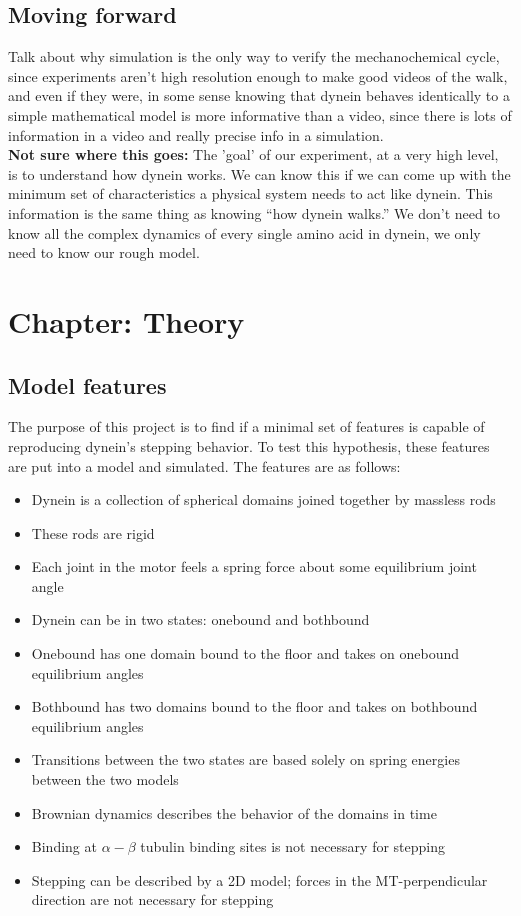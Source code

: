 \documentclass[10pt]{article} %
\begin{document}
\subsection{Moving forward}
Talk about why simulation is the only way to verify the mechanochemical cycle, since experiments
aren't high resolution enough to make good videos of the walk, and even if they were, in some sense
knowing that dynein behaves identically to a simple mathematical model is more informative than
a video, since there is lots of information in a video and really precise info in a simulation.\\

\textbf{Not sure where this goes:} The 'goal' of our experiment, at a very high level, is to
understand how dynein works. We can know this if we can come up with the minimum set of characteristics a physical system needs to act like dynein. This information is the same thing as knowing
``how dynein walks.'' We don't need to know all the complex dynamics of every single amino acid in
dynein, we only need to know our rough model.\\

\section{Chapter: Theory}
\subsection{Model features}
The purpose of this project is to find if a minimal set of features is capable of reproducing dynein's stepping behavior. To test this hypothesis, these features are put into a model and simulated. The features are as follows:

\begin{itemize}
\item Dynein is a collection of spherical domains joined together by massless rods
\item These rods are rigid
\item Each joint in the motor feels a spring force about some equilibrium joint angle
\item Dynein can be in two states: onebound and bothbound
\item Onebound has one domain bound to the floor and takes on onebound equilibrium angles
\item Bothbound has two domains bound to the floor and takes on bothbound equilibrium angles
\item Transitions between the two states are based solely on spring energies between the two models
\item Brownian dynamics describes the behavior of the domains in time
\item Binding at $\alpha-\beta$ tubulin binding sites is not necessary for stepping
\item Stepping can be described by a 2D model; forces in the MT-perpendicular direction are not necessary for stepping
\end{itemize}
\end{document}
